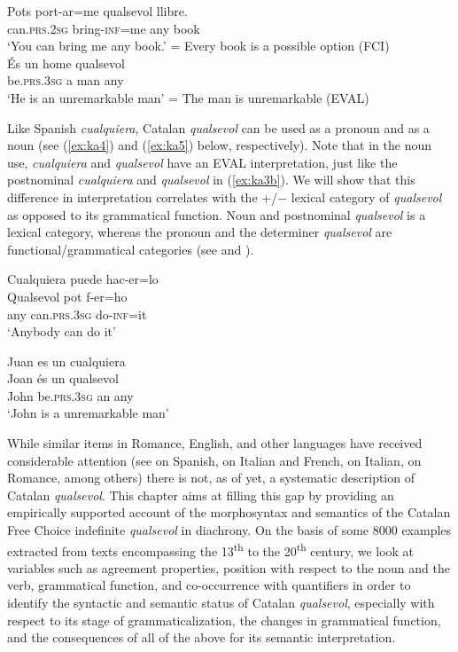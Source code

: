 \documentclass[output=paper,colorlinks,citecolor=brown]{langscibook}
\begin{document}
\ea \label{ex:ka3}
\ea\label{ex:ka3a} 
    \gll Pots port-ar=me qualsevol llibre.\\
    can.\textsc{prs.2sg} bring\textsc{-inf}=me any book\\
    \glt ‘You can bring me any book.’ = Every book is a possible option (FCI)\\
\ex\label{ex:ka3b} \gll És un home qualsevol\\
    be.\textsc{prs.3sg} a man any\\
    \glt ‘He is an unremarkable man’ = The man is unremarkable (EVAL)\\
\z
\z

Like Spanish \textit{cualquiera}, Catalan \textit{qualsevol} can be used as a pronoun and as a noun (see (\ref{ex:ka4}) and (\ref{ex:ka5}) below, respectively). Note that in the noun use, \textit{cualquiera} and \textit{qualsevol} have an EVAL interpretation, just like the postnominal \textit{cualquiera} and \textit{qualsevol} in (\ref{ex:ka3b}). We will show that this difference in interpretation correlates with the +/$-$ lexical category of \textit{qualsevol} as opposed to its grammatical function. Noun and postnominal \textit{qualsevol} is a lexical category, whereas the pronoun and the determiner \textit{qualsevol} are functional\slash grammatical categories (see  and ).

\ea \label{ex:ka4}
\ea Cualquiera puede hac-er=lo\\
\ex\gll Qualsevol pot f-er=ho\\
    any can.\textsc{prs.3sg} do-\textsc{inf}=it\\
    \glt ‘Anybody can do it’\\
\z

\ex \label{ex:ka5}
\ea Juan es un cualquiera\\
\ex \gll Joan és un qualsevol\\
    John be.\textsc{prs.3sg} an any\\
    \glt ‘John is a unremarkable man’\\
\z
\z

While similar items in Romance, English, and other languages have received considerable attention (see \cite{CompanyCompanyPozasLoyo2009, Rivero1988} on Spanish, \cite{Becker2014} on Italian and French, \cite{Stark2006} on Italian, \cite{Gianollo2018} on Romance, among others) there is not, as of yet, a systematic description of Catalan \textit{qualsevol}. This chapter aims at filling this gap by providing an empirically supported account of the morphosyntax and semantics of the Catalan Free Choice indefinite \textit{qualsevol} in diachrony. On the basis of some 8000 examples extracted from texts encompassing the 13\textsuperscript{th} to the 20\textsuperscript{th} century, we look at variables such as agreement properties, position with respect to the noun and the verb, grammatical function, and co-occurrence with quantifiers in order to identify the syntactic and semantic status of Catalan \textit{qualsevol}, especially with respect to its stage of grammaticalization, the changes in grammatical function, and the consequences of all of the above for its semantic interpretation.
\end{document}
